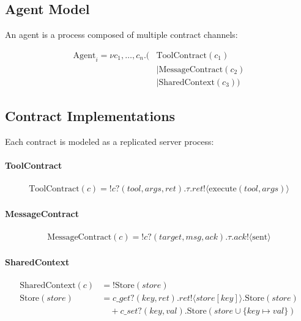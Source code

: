 \documentclass{article}
\begin{document}
\subsection{Agent Model}

An agent is a process composed of multiple contract channels:

\begin{align*}
\text{Agent}_i = \nu c_1, \ldots, c_n. (&\text{ToolContract}(c_1) \\
                                        &\mid \text{MessageContract}(c_2) \\
                                        &\mid \text{SharedContext}(c_3))
\end{align*}

\subsection{Contract Implementations}

Each contract is modeled as a replicated server process:

\paragraph{ToolContract}
\begin{align*}
\text{ToolContract}(c) = !c?(tool, args, ret). \tau. ret!\langle \text{execute}(tool, args) \rangle
\end{align*}

\paragraph{MessageContract}
\begin{align*}
\text{MessageContract}(c) = !c?(target, msg, ack). \tau. ack!\langle \text{sent} \rangle
\end{align*}

\paragraph{SharedContext}
\begin{align*}
\text{SharedContext}(c) &= !\text{Store}(store) \\
\text{Store}(store) &= c\_get?(key, ret). ret!\langle store[key] \rangle. \text{Store}(store) \\
                     &\quad + c\_set?(key, val). \text{Store}(store \cup \{key \mapsto val\})
\end{align*}
\end{document}
